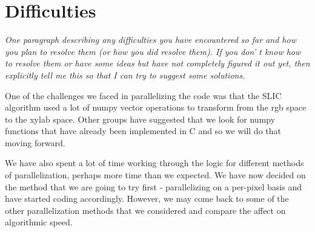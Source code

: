 \documentclass[11pt]{article}
\begin{document}
\section {Difficulties}
{\it
One paragraph describing any difficulties you have encountered so far and how
you plan to resolve them (or how you did resolve them). If you don' t know how
to resolve them or have some ideas but have not completely figured it out yet,
then explicitly tell me this so that I can try to suggest some solutions.}

One of the challenges we faced in parallelizing the code was that the SLIC algorithm used a lot of numpy vector operations to transform from the rgb space to the xylab space. Other groups have suggested that we look for numpy functions that have already been implemented in C and so we will do that moving forward. 

We have also spent a lot of time working through the logic for different methods of parallelization, perhaps more time than we expected. We have now decided on the method that we are going to try first - parallelizing on a per-pixel basis and have started coding accordingly. However, we may come back to some of the other parallelization methods that we considered and compare the affect on algorithmic speed. 
\end{document}
